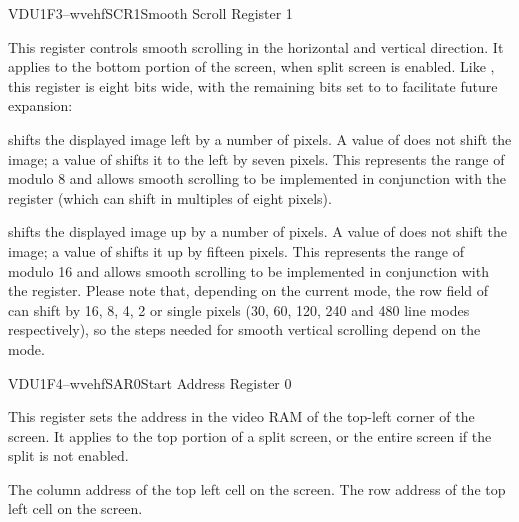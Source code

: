\begin{ioport}{VDU}{1F3}{--wvehf}{SCR1}{Smooth Scroll Register 1}

  This register controls smooth scrolling in the horizontal and vertical
  direction. It applies to the bottom portion of the screen, when split screen
  is enabled. Like , this register is eight bits wide, with the
  remaining bits set to  to facilitate future expansion:

  \begin{bitfield}
  \end{bitfield}

  \begin{description}  shifts the displayed image left by a
    number of pixels. A value of  does not shift the image; a value
    of  shifts it to the left by seven pixels. This represents the range
    of modulo 8 and allows smooth scrolling to be implemented in conjunction
    with the  register (which can shift in multiples of eight
    pixels).

     shifts the displayed image up by a number of
    pixels. A value of  does not shift the image; a value of
     shifts it up by fifteen pixels. This represents the range
    of modulo 16 and allows smooth scrolling to be implemented in
    conjunction with the  register. Please note that,
    depending on the current mode, the row field of  can
    shift by 16, 8, 4, 2 or single pixels (30, 60, 120, 240 and 480
    line modes respectively), so the steps needed for smooth vertical
    scrolling depend on the mode.
  \end{description}

\end{ioport}


\begin{ioport}{VDU}{1F4}{--wvehf}{SAR0}{Start Address Register 0}

  This register sets the address in the video RAM of the top-left corner of the
  screen. It applies to the top portion of a split screen, or the entire screen
  if the split is not enabled.

  \begin{bitfield}
  \end{bitfield}

  \begin{description}
   The column address of the top left cell on the screen.
   The row address of the top left cell on the screen.
  \end{description}

\end{ioport}






